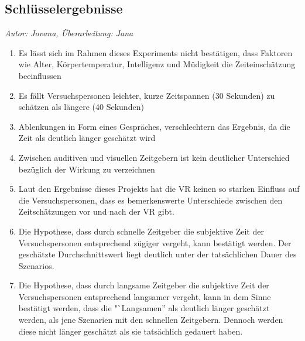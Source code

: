 \documentclass{Bericht}
\begin{document}
\subsection{Schlüsselergebnisse}
\textit{Autor: Jovana, Überarbeitung: Jana}\\
	\begin{enumerate}
		\item Es lässt sich im Rahmen dieses Experiments nicht bestätigen, dass Faktoren wie Alter, Körpertemperatur, Intelligenz und Müdigkeit die Zeiteinschätzung beeinflussen
		\item Es fällt Versuchspersonen leichter, kurze Zeitspannen (30 Sekunden) zu schätzen als längere (40 Sekunden)
		\item Ablenkungen in Form eines Gespräches, verschlechtern das Ergebnis, da die Zeit als deutlich länger geschätzt wird 
		\item Zwischen auditiven und visuellen Zeitgebern ist kein deutlicher Unterschied bezüglich der Wirkung zu verzeichnen
		\item Laut den Ergebnisse dieses Projekts hat die VR keinen so starken Einfluss auf die Versuchspersonen, dass es bemerkenswerte Unterschiede zwischen den Zeitschätzungen vor und nach der VR gibt.
		\item Die Hypothese, dass durch schnelle Zeitgeber die subjektive Zeit der Versuchspersonen entsprechend zügiger vergeht, kann bestätigt werden. Der geschätzte Durchschnittswert liegt  deutlich unter der tatsächlichen Dauer des Szenarios.
		\item Die Hypothese, dass durch langsame Zeitgeber die subjektive Zeit der Versuchspersonen entsprechend langsamer vergeht, kann in dem Sinne bestätigt werden, dass die "`Langsamen'' als deutlich länger geschätzt werden, als jene Szenarien mit den schnellen Zeitgebern. Dennoch werden diese nicht länger geschätzt als sie tatsächlich gedauert haben.
	\end{enumerate}
\end{document}
